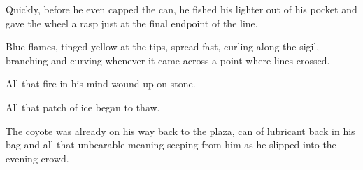 Quickly, before he even capped the can, he fished his lighter out of his pocket and gave the wheel a rasp just at the final endpoint of the line.

Blue flames, tinged yellow at the tips, spread fast, curling along the sigil, branching and curving whenever it came across a point where lines crossed.

All that fire in his mind wound up on stone.

All that patch of ice began to thaw.

The coyote was already on his way back to the plaza, can of lubricant back in his bag and all that unbearable meaning seeping from him as he slipped into the evening crowd.
